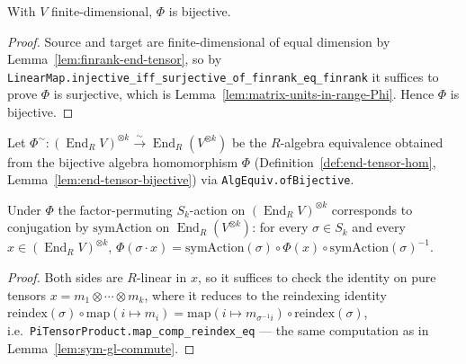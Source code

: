 \begin{lemma}
    \label{lem:end-tensor-bijective}
    With $V$ finite-dimensional, $\Phi$ is bijective.
\end{lemma}
\begin{proof}
    Source and target are finite-dimensional of equal dimension by
    Lemma~\ref{lem:finrank-end-tensor}, so by
    \texttt{LinearMap.injective\_iff\_surjective\_of\_finrank\_eq\_finrank} it suffices to prove $\Phi$ is
    surjective, which is Lemma~\ref{lem:matrix-units-in-range-Phi}. Hence $\Phi$ is bijective.
\end{proof}

\begin{definition}
    \label{def:end-tensor-equiv}
    \leanok
    Let $\Phi^{\sim} : (\operatorname{End}_R V)^{\otimes k} \xrightarrow{\sim}
    \operatorname{End}_R(V^{\otimes k})$ be the $R$-algebra equivalence obtained from the bijective
    algebra homomorphism $\Phi$ (Definition~\ref{def:end-tensor-hom},
    Lemma~\ref{lem:end-tensor-bijective}) via \texttt{AlgEquiv.ofBijective}.
\end{definition}

\begin{lemma}
    \label{lem:end-tensor-intertwine}
    \leanok
    Under $\Phi$ the factor-permuting $S_k$-action on $(\operatorname{End}_R V)^{\otimes k}$ corresponds
    to conjugation by $\mathrm{symAction}$ on $\operatorname{End}_R(V^{\otimes k})$: for every
    $\sigma \in S_k$ and every $x \in (\operatorname{End}_R V)^{\otimes k}$,
    $\Phi(\sigma \cdot x) = \mathrm{symAction}(\sigma) \circ \Phi(x) \circ \mathrm{symAction}(\sigma)^{-1}$.
\end{lemma}
\begin{proof}
    Both sides are $R$-linear in $x$, so it suffices to check the identity on pure tensors
    $x = m_1 \otimes \cdots \otimes m_k$, where it reduces to the reindexing identity
    $\mathrm{reindex}(\sigma) \circ \mathrm{map}(i \mapsto m_i) =
    \mathrm{map}(i \mapsto m_{\sigma^{-1} i}) \circ \mathrm{reindex}(\sigma)$, i.e.\
    \texttt{PiTensorProduct.map\_comp\_reindex\_eq} — the same computation as in
    Lemma~\ref{lem:sym-gl-commute}.
\end{proof}


